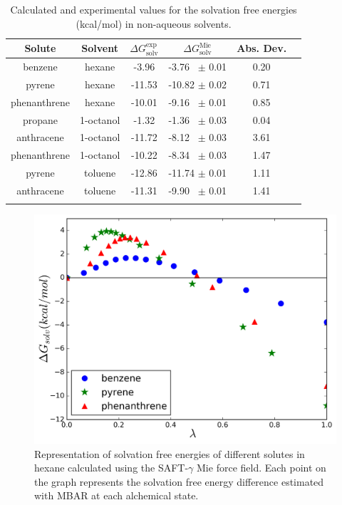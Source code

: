 \documentclass[final,12p,times,twocolumn]{elsarticle}
\begin{document}
	\begin{table}[h]
		\centering
		\caption{Calculated and experimental values for the solvation free energies (kcal/mol) in non-aqueous solvents.}
		\label{tbl:solv1}
		\begin{tabular}{cccccc}
			\hline\hline
			Solute       & Solvent   & $\Delta G_\text{solv}^\text{exp}$ & $\Delta G_\text{solv}^\text{Mie}$ & Abs. Dev.  \\ \hline
			benzene      & hexane    & -3.96                   & -3.76  $\,$ $\pm$ 0.01       & 0.20      &  \\
			pyrene       & hexane    & -11.53                  & -10.82 $\pm$ 0.02       & 0.71      &  \\
			phenanthrene & hexane    & -10.01                  & -9.16  $\,$ $\pm$ 0.01       & 0.85      &  \\
			propane      & 1-octanol & -1.32                   & -1.36  $\,$ $\pm$ 0.03       & 0.04      &  \\
			anthracene   & 1-octanol & -11.72                  & -8.12   $\,$ $\pm$ 0.03       & 3.61      &  \\
			phenanthrene & 1-octanol & -10.22                  & -8.34  $\,$ $\pm$ 0.03       & 1.47      &  \\
			pyrene       & toluene   & -12.86                  & -11.74 $\pm$ 0.01       & 1.11      &  \\
			anthracene   & toluene   & -11.31                  & -9.90 $\,$ $\pm$ 0.01        & 1.41      &  \\ \hline\hline
			&
		\end{tabular}
	\end{table}
	\begin{figure}[h]
		\centering
		\includegraphics[width=1.0\linewidth]{Figures/hexart}
		\caption{Representation of solvation free energies of different solutes in hexane calculated using the SAFT-$\gamma$ Mie force field. Each point on the graph represents the solvation free energy difference estimated with MBAR at each alchemical state.}
		\label{fig:hex}
	\end{figure}
\end{document}
